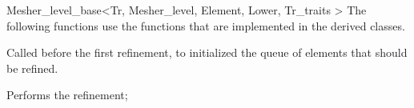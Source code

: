 \begin{ccRefClass}{Mesher_level_base<Tr, Mesher_level, Element, Lower,
Tr_traits >}
The following functions use the functions that are implemented in 
the derived classes.

	{ Called before the first refinement, to initialized the queue of
      	elements that should be refined.}


 

{ Performs the refinement;}





 


  






 


\end{ccRefClass}
